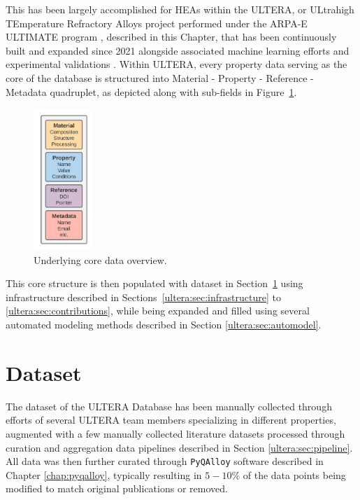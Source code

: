 This has been largely accomplished for HEAs within the ULTERA, or ULtrahigh TEmperature Refractory Alloys project performed under the ARPA-E ULTIMATE program \cite{ULTIMATEArpa-e.energy.gov}, described in this Chapter, that has been continuously built and expanded since 2021 \cite{Debnath2021GenerativeAlloys} alongside associated machine learning efforts \cite{Debnath2023ComparingAlloys} and experimental validations \cite{Li2024DesignExperiments}. Within ULTERA, every property data serving as the core of the database is structured into Material - Property - Reference - Metadata quadruplet, as depicted along with sub-fields in Figure~\ref{ultera:fig:material}.

\begin{figure}[H]
    \centering
    \includegraphics[width=0.2\textwidth]{ultera/ULTERA Data Detail_material.png}
    \caption{Underlying core data overview.}
    \label{ultera:fig:material}
\end{figure}

This core structure is then populated with dataset in Section~\ref{ultera:sec:datadescription} using infrastructure described in Sections~\ref{ultera:sec:infrastructure} to \ref{ultera:sec:contributions}, while being expanded and filled using several automated modeling methods described in Section \ref{ultera:sec:automodel}.


\section{Dataset} \label{ultera:sec:datadescription}
\newcommand{\statisticstime}{April 2024}

The dataset of the ULTERA Database has been manually collected through efforts of several ULTERA team members specializing in different properties, augmented with a few manually collected literature datasets processed through curation and aggregation data pipelines described in Section \ref{ultera:sec:pipeline}. All data was then further curated through \texttt{PyQAlloy} software described in Chapter \ref{chap:pyqalloy}, typically resulting in $5-10\%$ of the data points being modified to match original publications or removed.


